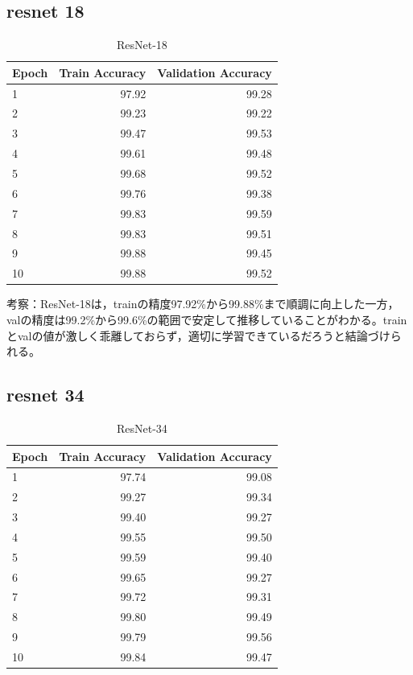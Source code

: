 \documentclass[a4paper,11pt,titlepage]{jsarticle}
\begin{document}
\subsection{resnet 18}
\begin{table}[H]
\centering
\caption{ResNet-18}
\label{tab:resnet18}
\begin{tabular}{lrr}
\hline
 Epoch &  Train Accuracy &  Validation Accuracy \\
\hline
     1 &           97.92 &                99.28 \\
     2 &           99.23 &                99.22 \\
     3 &           99.47 &                99.53 \\
     4 &           99.61 &                99.48 \\
     5 &           99.68 &                99.52 \\
     6 &           99.76 &                99.38 \\
     7 &           99.83 &                99.59 \\
     8 &           99.83 &                99.51 \\
     9 &           99.88 &                99.45 \\
    10 &           99.88 &                99.52 \\
\hline
\end{tabular}
\end{table}

考察：ResNet-18は，trainの精度97.92\%から99.88\%まで順調に向上した一方，valの精度は99.2\%から99.6\%の範囲で安定して推移していることがわかる。trainとvalの値が激しく乖離しておらず，適切に学習できているだろうと結論づけられる。


\subsection{resnet 34}
\begin{table}[h]
\centering
\caption{ResNet-34}
\label{tab:resnet34}
\begin{tabular}{lrr}
\hline
 Epoch &  Train Accuracy &  Validation Accuracy \\
\hline
     1 &           97.74 &                99.08 \\
     2 &           99.27 &                99.34 \\
     3 &           99.40 &                99.27 \\
     4 &           99.55 &                99.50 \\
     5 &           99.59 &                99.40 \\
     6 &           99.65 &                99.27 \\
     7 &           99.72 &                99.31 \\
     8 &           99.80 &                99.49 \\
     9 &           99.79 &                99.56 \\
    10 &           99.84 &                99.47 \\
\hline
\end{tabular}
\end{table}
\end{document}
